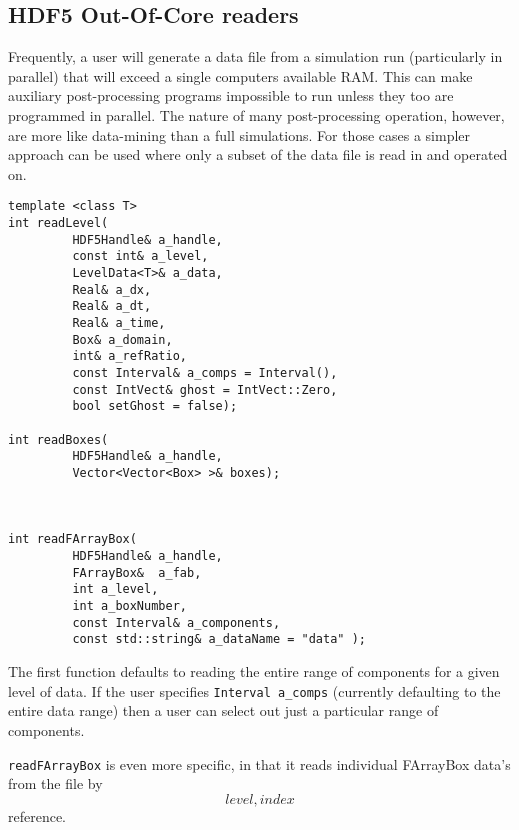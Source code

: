 \subsection{HDF5 Out-Of-Core readers}

Frequently, a user will generate a data file from a simulation
run (particularly in parallel) that will exceed a single computers
available RAM.  This can make auxiliary post-processing programs
impossible to run unless they too are programmed in parallel. The
nature of many post-processing operation, however, are more
like data-mining than a full simulations.  For those cases a
simpler approach can be used where only a subset of the 
data file is read in and operated on.

\begin{verbatim}
template <class T>
int readLevel(
         HDF5Handle& a_handle,  
         const int& a_level, 
         LevelData<T>& a_data, 
         Real& a_dx, 
         Real& a_dt, 
         Real& a_time, 
         Box& a_domain,
         int& a_refRatio, 
         const Interval& a_comps = Interval(), 
         const IntVect& ghost = IntVect::Zero, 
         bool setGhost = false);

int readBoxes(
         HDF5Handle& a_handle,
	     Vector<Vector<Box> >& boxes);
 


int readFArrayBox(
         HDF5Handle& a_handle,
	     FArrayBox&  a_fab,
	     int a_level,
	     int a_boxNumber,
	     const Interval& a_components,
	     const std::string& a_dataName = "data" );

\end{verbatim}

The first function defaults to reading the entire range of components for a given
level of data.  If the user specifies {\tt Interval a\_comps} (currently defaulting
to the entire data range) then a user can select out just a particular range of
components.

{\tt readFArrayBox} is even more specific, in that it reads individual FArrayBox data's
from the file by \[level,index\] reference.
